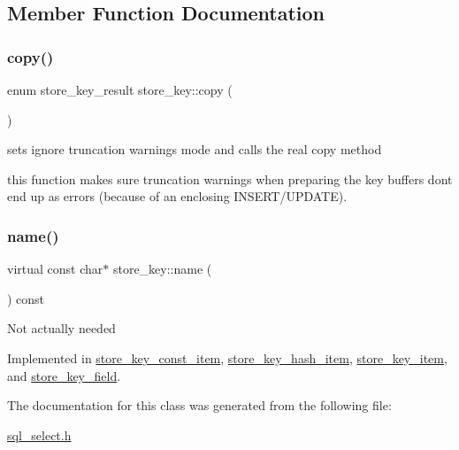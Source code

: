 \subsection{Member Function Documentation}
\mbox{\label{classstore__key_a55d3bd31a4655a157fee7b42a15adfb4}} 
\subsubsection{\texorpdfstring{copy()}{copy()}}
{\footnotesize\ttfamily enum store\+\_\+key\+\_\+result store\+\_\+key\+::copy (\begin{DoxyParamCaption}{ }\end{DoxyParamCaption})\hspace{0.3cm}{\ttfamily [inline]}}



sets ignore truncation warnings mode and calls the real copy method 

this function makes sure truncation warnings when preparing the key buffers don\textquotesingle{}t end up as errors (because of an enclosing I\+N\+S\+E\+R\+T/\+U\+P\+D\+A\+TE). \mbox{\label{classstore__key_a1c78dad4f3335d03b297cf30592914bf}} 
\subsubsection{\texorpdfstring{name()}{name()}}
{\footnotesize\ttfamily virtual const char$\ast$ store\+\_\+key\+::name (\begin{DoxyParamCaption}{ }\end{DoxyParamCaption}) const\hspace{0.3cm}{\ttfamily [pure virtual]}}

Not actually needed 

Implemented in \mbox{\hyperlink{classstore__key__const__item_a1c578851203067d4ab3c90b81d7b3cfa}{store\+\_\+key\+\_\+const\+\_\+item}}, \mbox{\hyperlink{classstore__key__hash__item_a213002a48540add6652dfc3d908ee367}{store\+\_\+key\+\_\+hash\+\_\+item}}, \mbox{\hyperlink{classstore__key__item_a88e2baa208896dcde9ba66e9715efc3c}{store\+\_\+key\+\_\+item}}, and \mbox{\hyperlink{classstore__key__field_acc151e2c25c0fe5c09d2a28c4595413b}{store\+\_\+key\+\_\+field}}.



The documentation for this class was generated from the following file\+:\begin{DoxyCompactItemize}
\item 
\mbox{\hyperlink{sql__select_8h}{sql\+\_\+select.\+h}}\end{DoxyCompactItemize}
